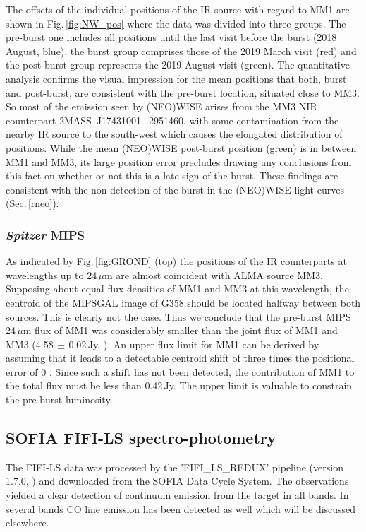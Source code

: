 The offsets of the individual positions of the IR source with regard to MM1 are shown in Fig.\,\ref{fig:NW_pos} where the data was divided into three groups. The pre-burst one includes all positions until the last visit before the burst (2018 August, blue), the burst group comprises those of the 2019 March visit (red) and the post-burst group represents the 2019 August visit (green). The quantitative analysis confirms the visual impression for the mean positions that both, burst and post-burst, are consistent with the pre-burst location, situated close to MM3. So most of the emission seen by (NEO)WISE arises from the MM3 NIR counterpart 2MASS~J17431001$-$2951460, with some contamination from the nearby IR source to the south-west which causes the elongated distribution of positions.
While the mean (NEO)WISE post-burst position (green) is in between MM1 and MM3, its large position error precludes drawing any conclusions from this fact on whether or not this is a late sign of the burst. These findings are consistent with the non-detection of the burst in the (NEO)WISE light curves (Sec.\,\ref{rneo}).

\subsubsection{{\em Spitzer} MIPS}\label{mips}
As indicated by Fig.\,\ref{fig:GROND} (top) the positions of the IR counterparts at wavelengths up to 24\,$\mu$m are almost coincident with ALMA source MM3. Supposing about equal flux densities of MM1 and MM3 at this wavelength, the centroid of the MIPSGAL image of G358 should be located halfway between both sources. This is clearly not the case. Thus we conclude that the pre-burst MIPS 24\,$\mu$m flux of MM1 was considerably smaller than the joint flux of MM1 and MM3 (4.58$\,{\pm}\,$0.02\,Jy, \citealp{2009ApJS..181..227H}). An upper flux limit for MM1 can be derived by assuming that it leads to a detectable centroid shift of three times the positional error of 0 \citep{2009ApJS..181..227H}. 
Since such a shift has not been detected, the contribution of MM1 to the total flux must be less than 0.42\,Jy. The upper limit is valuable to constrain the pre-burst luminosity.

\subsection{SOFIA FIFI-LS spectro-photometry}\label{rfifi}
The FIFI-LS data was processed by the 'FIFI\_LS\_REDUX' pipeline  (version 1.7.0, \citealp{2015ASPC..495..355C}) and downloaded from the SOFIA Data Cycle System. The observations yielded a clear detection of continuum emission from the target in all bands. In several bands CO line emission has been detected as well which will be discussed elsewhere. 

